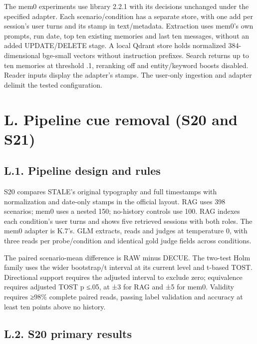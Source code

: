 \documentclass[11pt]{article}
\begin{document}
The mem0 experiments use library 2.2.1 with its decisions unchanged under the specified adapter. Each scenario/\allowbreak{}condition has a separate store, with one add per session's user turns and its stamp in text/\allowbreak{}metadata. Extraction uses mem0's own prompts, run date, top ten existing memories and last ten messages, without an added UPDATE/\allowbreak{}DELETE stage. A local Qdrant store holds normalized 384-dimensional bge-small vectors without instruction prefixes. Search returns up to ten memories at threshold .1, reranking off and entity/\allowbreak{}keyword boosts disabled. Read\-er inputs display the adapter's stamps. The user-only ingestion and adapter delimit the tested configuration.

\label{appendix-l}

\section{L. Pipeline cue removal (S20 and S21)}\label{l.-pipeline-cue-removal-s20-and-s21}

\subsection{L.1. Pipeline design and rules}\label{l.1.-pipeline-design-and-rules}

S20 compares STALE's original typography and full timestamps with normalization and date-only stamps in the official layout. RAG uses 398 scenarios; mem0 uses a nested 150; no-history controls use 100. RAG indexes each condition's user turns and shows five retrieved sessions with both roles. The mem0 adapter is K.7's. GLM extracts, reads and judges at temperature 0, with three reads per probe/\allowbreak{}condition and identical gold judge fields across conditions.

The paired scenario-mean difference is RAW minus DECUE. The two-test Holm family uses the wider bootstrap/\allowbreak{}t interval at its current level and t-based TOST. Directional support requires the adjusted interval to exclude zero; equivalence requires adjusted TOST p ≤.05, at ±3 for RAG and ±5 for mem0. Validity requires ≥98\% complete paired reads, passing label validation and accuracy at least ten points above no history.

\subsection{L.2. S20 primary results}\label{l.2.-s20-primary-results}
\end{document}
